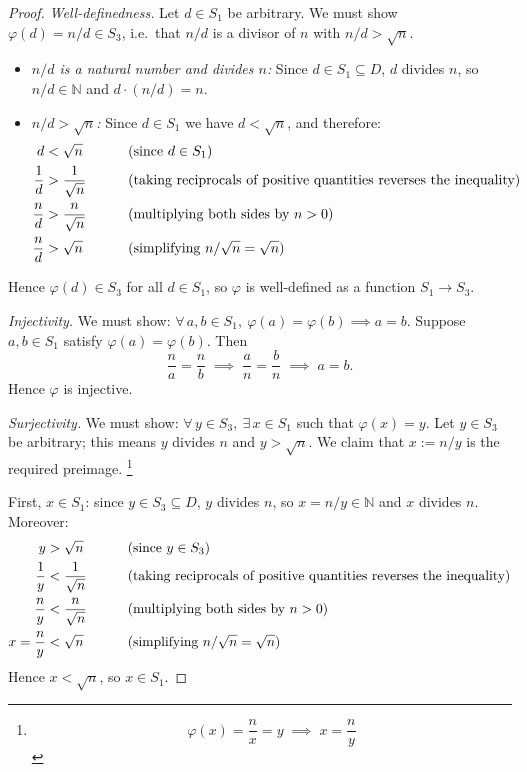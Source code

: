 \documentclass[12pt]{article}
\theoremstyle{remark}
\begin{document}
\begin{proof}
\medskip
\emph{Well-definedness.}\;
Let $d \in S_1$ be arbitrary. We must show $\varphi(d) = n/d \in S_3$, i.e.\
that $n/d$ is a divisor of $n$ with $n/d > \sqrt{n}$.
\begin{itemize}
    \item \emph{$n/d$ is a natural number and divides $n$:} Since $d \in S_1
          \subseteq D$, $d$ divides $n$, so $n/d \in \mathbb{N}$ and
          $d \cdot (n/d) = n$.
    \item \emph{$n/d > \sqrt{n}$:} Since $d \in S_1$ we have $d < \sqrt{n}$,
          and therefore:
          \begin{alignat}{2}
              d &< \sqrt{n}
                  &\qquad& \text{(since } d \in S_1\text{)} \notag \\
              \frac{1}{d} &> \frac{1}{\sqrt{n}}
                  &\qquad& \text{(taking reciprocals of positive quantities reverses the inequality)} \notag \\
              \frac{n}{d} &> \frac{n}{\sqrt{n}}
                  &\qquad& \text{(multiplying both sides by } n > 0\text{)} \notag \\
              \frac{n}{d} &> \sqrt{n}
                  &\qquad& \text{(simplifying } n/\sqrt{n} = \sqrt{n}\text{)} \notag
          \end{alignat}
\end{itemize}
Hence $\varphi(d) \in S_3$ for all $d \in S_1$, so $\varphi$ is well-defined
as a function $S_1 \to S_3$.

\medskip
\emph{Injectivity.}\;
We must show: $\forall\, a, b \in S_1,\ \varphi(a) = \varphi(b) \implies a =
b$.  Suppose $a, b \in S_1$ satisfy $\varphi(a) = \varphi(b)$.  Then
\[
    \frac{n}{a} = \frac{n}{b}
    \;\implies\;
    \frac{a}{n} = \frac{b}{n}
    \;\implies\;
    a = b.
\]
Hence $\varphi$ is injective.

\medskip
\emph{Surjectivity.}\;
We must show: $\forall\, y \in S_3,\ \exists\, x \in S_1$ such that
$\varphi(x) = y$.  Let $y \in S_3$ be arbitrary; this means $y$ divides $n$
and $y > \sqrt{n}$.  We claim that $x := n/y$ is the required preimage. \footnote{
\[
    \varphi(x) = \frac{n}{x} = y
    \;\implies\;
    x = \frac{n}{y}
\]
}

First, $x \in S_1$: since $y \in S_3 \subseteq D$, $y$ divides $n$, so $x =
n/y \in \mathbb{N}$ and $x$ divides $n$.  Moreover:
\begin{alignat}{2}
    y &> \sqrt{n}
        &\qquad& \text{(since } y \in S_3\text{)} \notag \\
    \frac{1}{y} &< \frac{1}{\sqrt{n}}
        &\qquad& \text{(taking reciprocals of positive quantities reverses the inequality)} \notag \\
    \frac{n}{y} &< \frac{n}{\sqrt{n}}
        &\qquad& \text{(multiplying both sides by } n > 0\text{)} \notag \\
    x = \frac{n}{y} &< \sqrt{n}
        &\qquad& \text{(simplifying } n/\sqrt{n} = \sqrt{n}\text{)} \notag
\end{alignat}
Hence $x < \sqrt{n}$, so $x \in S_1$.


\end{proof}
\end{document}
